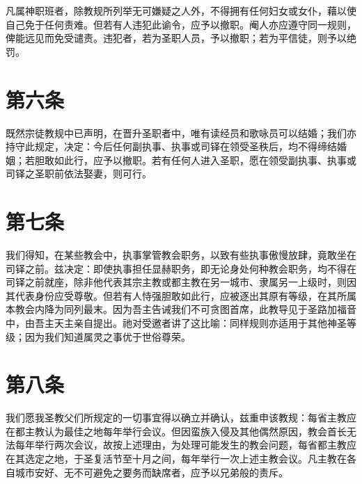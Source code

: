 凡属神职班者，除教规所列举无可嫌疑之人外，不得拥有任何妇女或女仆，藉以使自己免于任何责难。但若有人违犯此谕令，应予以撤职。阉人亦应遵守同一规则，俾能远见而免受谴责。违犯者，若为圣职人员，予以撤职；若为平信徒，则予以绝罚。\par


\section{第六条}

既然宗徒教规中已声明，在晋升圣职者中，唯有读经员和歌咏员可以结婚；我们亦持守此规定，决定：今后任何副执事、执事或司铎在领受圣秩后，均不得缔结婚姻；若胆敢如此行，应予以撤职。若有任何人进入圣职，愿在领受副执事、执事或司铎之圣职前依法娶妻，则可行。\par


\section{第七条}

我们得知，在某些教会中，执事掌管教会职务，以致有些执事傲慢放肆，竟敢坐在司铎之前。兹决定：即使执事担任显赫职务，即无论身处何种教会职务，均不得在司铎之前就座，除非他代表其宗主教或都主教在另一城市、隶属另一上级时，则因其代表身份应受尊敬。但若有人恃强胆敢如此行，应被逐出其原有等级，在其所属本教会内降为同列最末。因为吾主告诫我们不可贪图首席，此教导见于圣路加福音中，由吾主天主亲自提出。祂对受邀者讲了这比喻：同样规则亦适用于其他神圣等级；因为我们知道属灵之事优于世俗尊荣。\par


\section{第八条}

我们愿我圣教父们所规定的一切事宜得以确立并确认，兹重申该教规：每省主教应在都主教认为最佳之地每年举行会议。但因蛮族入侵及其他偶然原因，教会首长无法每年举行两次会议，故按上述理由，为处理可能发生的教会问题，每省都主教应在其选定之地，于圣复活节至十月之间，每年举行一次上述主教会议。凡主教在各自城市安好、无不可避免之要务而缺席者，应予以兄弟般的责斥。\par

